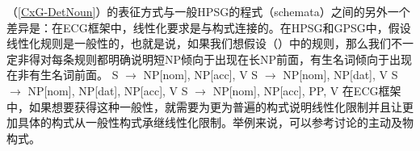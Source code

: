 （\ref{CxG-DetNoun}）的表征方式与一般HPSG的程式（schemata）之间的另外一个差异是：在ECG框架中，线性化要求是与构式连接的。在HPSG\indexhpsgc 和GPSG\indexgpsgc 中，假设线性化规则是一般性的，也就是说，如果我们想假设（）中的规则，那么我们不一定非得对每条规则都明确说明短NP倾向于出现在长NP前面，有生名词倾向于出现在非有生名词前面。
\eal
\ex S $\to$ NP[nom], NP[acc], V
\ex S $\to$ NP[nom], NP[dat], V
\ex S $\to$ NP[nom], NP[dat], NP[acc], V
\ex S $\to$ NP[nom], NP[acc], PP, V
\zl
\addlines[2]
在ECG框架中，如果想要获得这种一般性，就需要为更为普遍的构式说明线性化限制并且让更加具体的构式从一般性构式承继线性化限制。举例来说，可以参考\citet[]{BC2005a}讨论的主动及物构式。

